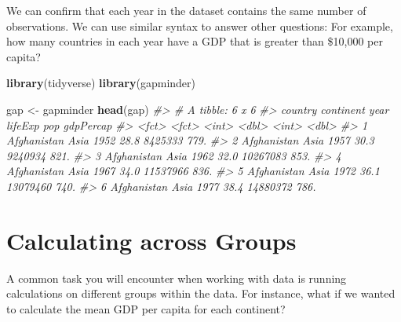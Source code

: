 \documentclass[
]{book}
\newenvironment{Shaded}{\begin{snugshade}}{\end{snugshade}}
\newcommand{\CommentTok}[1]{\textcolor[rgb]{0.56,0.35,0.01}{\textit{#1}}}
\newcommand{\DecValTok}[1]{\textcolor[rgb]{0.00,0.00,0.81}{#1}}
\newcommand{\KeywordTok}[1]{\textcolor[rgb]{0.13,0.29,0.53}{\textbf{#1}}}
\newcommand{\NormalTok}[1]{#1}
\newcommand{\OperatorTok}[1]{\textcolor[rgb]{0.81,0.36,0.00}{\textbf{#1}}}
\newcommand{\StringTok}[1]{\textcolor[rgb]{0.31,0.60,0.02}{#1}}
\begin{document}
We can confirm that each year in the dataset contains the same number of observations. We can use similar syntax to answer other questions: For example, how many countries in each year have a GDP that is greater than \$10,000 per capita?

\begin{Shaded}
\end{Shaded}

\begin{Shaded}
\begin{Highlighting}[]
\KeywordTok{library}\NormalTok{(tidyverse)}
\KeywordTok{library}\NormalTok{(gapminder)}

\NormalTok{gap <-}\StringTok{ }\NormalTok{gapminder}
\KeywordTok{head}\NormalTok{(gap)}
\CommentTok{#> # A tibble: 6 x 6}
\CommentTok{#>   country     continent  year lifeExp      pop gdpPercap}
\CommentTok{#>   <fct>       <fct>     <int>   <dbl>    <int>     <dbl>}
\CommentTok{#> 1 Afghanistan Asia       1952    28.8  8425333      779.}
\CommentTok{#> 2 Afghanistan Asia       1957    30.3  9240934      821.}
\CommentTok{#> 3 Afghanistan Asia       1962    32.0 10267083      853.}
\CommentTok{#> 4 Afghanistan Asia       1967    34.0 11537966      836.}
\CommentTok{#> 5 Afghanistan Asia       1972    36.1 13079460      740.}
\CommentTok{#> 6 Afghanistan Asia       1977    38.4 14880372      786.}
\end{Highlighting}
\end{Shaded}

\hypertarget{calculating-across-groups}{%
\section{Calculating across Groups}\label{calculating-across-groups}}

A common task you will encounter when working with data is running calculations on different groups within the data. For instance, what if we wanted to calculate the mean GDP per capita for each continent?
\end{document}

